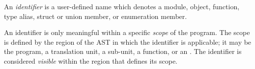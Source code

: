 
\begin{grammar}
\\
\\
 \terminal{::} \\

\\
\\
 \\

\oneof \\
     
     
 \\
    
     
  \\
     
     
 \\
    
     
  \\
\terminal{\_}\\

\oneof \\
     
   \\

\\
\end{grammar}


\specsubitem
An \textit{identifier} is a user-defined name which denotes a module, object,
function, type alias, struct or union member, or enumeration member.

\specsubitem
An identifier is only meaningful within a specific \textit{scope} of the
program. The scope is defined by the region of the AST in which the identifier
is applicable; it may be the program, a translation unit, a sub-unit, a
function, or an . The identifier is considered
\textit{visible} within the region that defines its scope.

